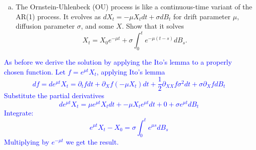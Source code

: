 \documentclass[11pt]{extarticle}
\theoremstyle{plain}
\theoremstyle{definition}
\begin{document}
\begin{enumerate}[(a)]
\item The Ornstein-Uhlenbeck (OU) process is like a continuous-time variant of the AR(1) process. It evolves as $dX_t = - \mu X_t dt + \sigma dB_t$ for drift parameter $\mu$, diffusion parameter $\sigma$, and some $X$. Show that it solves 
\begin{equation*}
	X_t = X_0 e^{- \mu t} + \sigma \int_0^t e^{-\mu(t - s)} dB_s.
\end{equation*}
\end{enumerate}

\textcolor{blue}{As before we derive the solution by applying the Ito's lemma to a properly chosen function. Let $f=e^{\mu t}X_t$, applying Ito's lemma
$$df = de^{\mu t}X_t = \partial_t f dt + \partial_X f (-\mu X_t)dt+\frac{1}{2}\partial_{XX} f \sigma ^2 dt + \sigma \partial_X f dB_t$$ Substitute the partial derivatives $$de^{\mu t}X_t = \mu e^{\mu t}X_t dt + -\mu X_t e^{\mu t} dt+ 0 + \sigma e^{\mu t} dB_t$$ Integrate: $$e^{\mu t}X_t-X_0= \sigma \int_0^te^{\mu s}dB_s$$ Multiplying by $e^{-\mu t}$ we get the result.}
\end{document}
